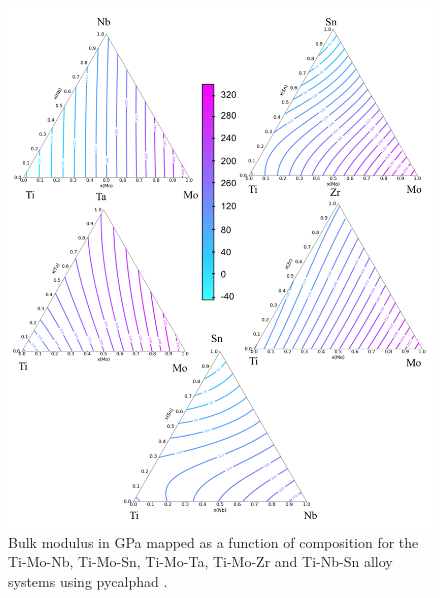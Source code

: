 \pagebreak
\begin{figure}[H]
	\centering
	\includegraphics[width=\textwidth]{Chapter-6/Figures/tixybulk1.png}
	\caption{Bulk modulus in GPa mapped as a function of composition for the Ti-Mo-Nb, Ti-Mo-Sn, Ti-Mo-Ta, Ti-Mo-Zr and Ti-Nb-Sn alloy systems using pycalphad \cite{Otis2017}.}
	\label{Ch6-figure:tixybulk1}
\end{figure}

